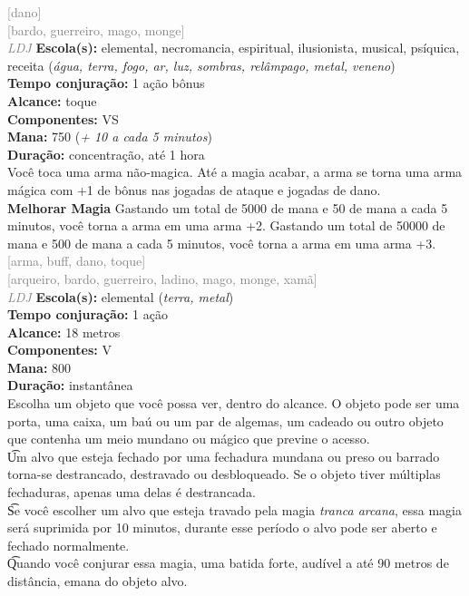 \documentclass{RPG_Adventure}[2021/10/20]
\begin{document}
{\scriptsize \textcolor{gray}{[dano]\\}}
{\scriptsize \textcolor{gray}{[bardo, guerreiro, mago, monge]\\}}
{\tiny \textcolor{gray}{\textit{LDJ}}}\jump{}
{\small \t \textbf{Escola(s):} elemental, necromancia, espiritual, ilusionista, musical, psíquica, receita (\textit{água, terra, fogo, ar, luz, sombras, relâmpago, metal, veneno})\\\t \textbf{Tempo conjuração:} 1 ação bônus\\\t \textbf{Alcance:} toque\\\t \textbf{Componentes:} VS\\\t \textbf{Mana:} 750 (\textit{+ 10 a cada 5 minutos})\\\t \textbf{Duração:} concentração, até 1 hora\\}
{\normalsize Você toca uma arma não-magica. Até a magia acabar, a arma se torna uma arma mágica com +1 de bônus nas jogadas de ataque e jogadas de dano.\\\t \textbf{Melhorar Magia} Gastando um total de 5000 de mana e 50 de mana a cada 5 minutos, você torna a arma em uma arma +2. Gastando um total de 50000 de mana e 500 de mana a cada 5 minutos, você torna a arma em uma arma +3.\\}
{\scriptsize \textcolor{gray}{[arma, buff, dano, toque]\\}}
{\scriptsize \textcolor{gray}{[arqueiro, bardo, guerreiro, ladino, mago, monge, xamã]\\}}
{\tiny \textcolor{gray}{\textit{LDJ}}}\jump{}
{\small \t \textbf{Escola(s):} elemental (\textit{terra, metal})\\\t \textbf{Tempo conjuração:} 1 ação\\\t \textbf{Alcance:} 18 metros\\\t \textbf{Componentes:} V\\\t \textbf{Mana:} 800\\\t \textbf{Duração:} instantânea\\}
{\normalsize Escolha um objeto que você possa ver, dentro do alcance. O objeto pode ser uma porta, uma caixa, um baú ou um par de algemas, um cadeado ou outro objeto que contenha um meio mundano ou mágico que previne o acesso.\\\t Um alvo que esteja fechado por uma fechadura mundana ou preso ou barrado torna-se destrancado, destravado ou desbloqueado. Se o objeto tiver múltiplas fechaduras, apenas uma delas é destrancada.\\\t Se você escolher um alvo que esteja travado pela magia \textit{tranca arcana}, essa magia será suprimida por 10 minutos, durante esse período o alvo pode ser aberto e fechado normalmente.\\\t Quando você conjurar essa magia, uma batida forte, audível a até 90 metros de distância, emana do objeto alvo.\\}
\end{document}
